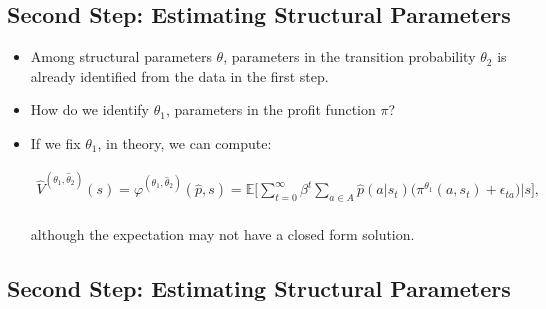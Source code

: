 \documentclass[]{book}
\providecommand{\tightlist}{%
  \setlength{\itemsep}{0pt}\setlength{\parskip}{0pt}}
\begin{document}
\subsection{Second Step: Estimating Structural
Parameters}\label{second-step-estimating-structural-parameters}

\begin{itemize}
\tightlist
\item
  Among structural parameters \(\theta\), parameters in the transition
  probability \(\theta_2\) is already identified from the data in the
  first step.
\item
  How do we identify \(\theta_1\), parameters in the profit function
  \(\pi\)?
\item
  If we fix \(\theta_1\), in theory, we can compute:

  \begin{equation}
  \begin{split}
  \hat{V}^{(\theta_1, \hat{\theta}_2)}(s) = \varphi^{(\theta_1, \hat{\theta}_2)}(\hat{p}, s) = \mathbb{E}\Bigg[ \sum_{t = 0}^\infty \beta^t \sum_{a \in A}\hat{p}(a|s_t)\Bigg(\pi^{\theta_1}(a, s_t) + \epsilon_{ta}\Bigg)\Bigg|s\Bigg],\\
  \end{split}
  \end{equation}

  although the expectation may not have a closed form solution.
\end{itemize}

\subsection{Second Step: Estimating Structural
Parameters}\label{second-step-estimating-structural-parameters-1}
\end{document}

